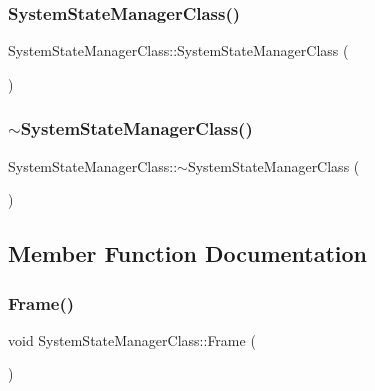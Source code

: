 \subsubsection{\texorpdfstring{System\+State\+Manager\+Class()}{SystemStateManagerClass()}\hspace{0.1cm}{\footnotesize\ttfamily [2/2]}}
{\footnotesize\ttfamily System\+State\+Manager\+Class\+::\+System\+State\+Manager\+Class (\begin{DoxyParamCaption}\item[{const \hyperlink{class_system_state_manager_class}{System\+State\+Manager\+Class} \&}]{ }\end{DoxyParamCaption})\hspace{0.3cm}{\ttfamily [private]}}

\mbox{\label{class_system_state_manager_class_a18fcccaa9a79eaedb5ba00fc6f2564c5}} 
\subsubsection{\texorpdfstring{$\sim$\+System\+State\+Manager\+Class()}{~SystemStateManagerClass()}}
{\footnotesize\ttfamily System\+State\+Manager\+Class\+::$\sim$\+System\+State\+Manager\+Class (\begin{DoxyParamCaption}{ }\end{DoxyParamCaption})\hspace{0.3cm}{\ttfamily [private]}}



\subsection{Member Function Documentation}
\mbox{\label{class_system_state_manager_class_a9f20907fb689668c4f828b6b87be7b37}} 
\subsubsection{\texorpdfstring{Frame()}{Frame()}}
{\footnotesize\ttfamily void System\+State\+Manager\+Class\+::\+Frame (\begin{DoxyParamCaption}{ }\end{DoxyParamCaption})}



